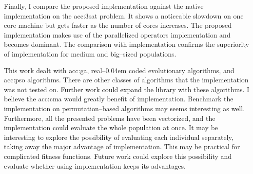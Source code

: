 Finally, I compare the proposed implementation against the native \cpp implementation on the \acrshort{acc:3sat} problem. It shows a noticeable slowdown on one core machine but gets faster as the number of cores increases. The proposed implementation makes use of the parallelized operators implementation and becomes dominant. The comparison with \cpp implementation confirms the superiority of \cuda implementation for medium and big--sized populations.

This work dealt with \acrshort{acc:ga}, real--\kern0.04em coded evolutionary algorithms, and \acrshort{acc:pso} algorithms. There are other classes of algorithms that the implementation was not tested on. Further work could expand the library with these algorithms. I believe the \acrshort{acc:cma} would greatly benefit of \cuda implementation. Benchmark the implementation on permutation--based algorithms may seems interesting as well. Furthermore, all the presented problems have been vectorized, and the \gpu implementation could evaluate the whole population at once. It may be interesting to explore the possibility of evaluating each individual separately, taking away the major advantage of \gpu implementation. This may be practical for complicated fitness functions. Future work could explore this possibility and evaluate whether using \gpu implementation keeps its advantages.